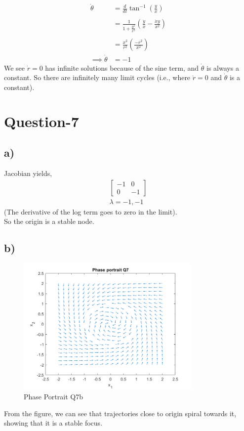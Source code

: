 \documentclass{article}
\begin{document}
\begin{align*}
    \dot{\theta} &= \frac{d}{dt}\tan^{-1}(\frac{y}{x}) \\ \\
    &= \frac{1}{1 + \frac{y^2}{x^2}}(\frac{\dot{y}}{x} - \frac{\dot{x}y}{x^2}) \\ \\
    &= \frac{x^2}{r^2}(\frac{-r^2}{x^2}) \\
    \implies \dot{\theta} &= -1
\end{align*}
We see $\dot{r} = 0$ has infinite solutions because of the sine term, and $\dot{\theta}$ is always a constant. So there are infinitely many limit cycles (i.e., where $\dot{r} = 0$ and $\dot{\theta}$ is a constant).


\section*{Question-7}
\subsection*{a)}
Jacobian yields,
\begin{align*}
    \begin{bmatrix} -1 & 0\\ 0 & -1 \end{bmatrix} \\
    \lambda  = -1, -1
\end{align*}
(The derivative of the log term goes to zero in the limit).  \\
So the origin is a stable node.
\\
\subsection*{b)}
\begin{figure}[h!]
\centering
\includegraphics[width=0.8\textwidth]{plots/Q7b.png}
\caption{\label{7b}Phase Portrait Q7b}
\end{figure}
\FloatBarrier
From the figure, we can see that trajectories close to origin spiral towards it, showing that it is a stable focus.
\\
\end{document}
